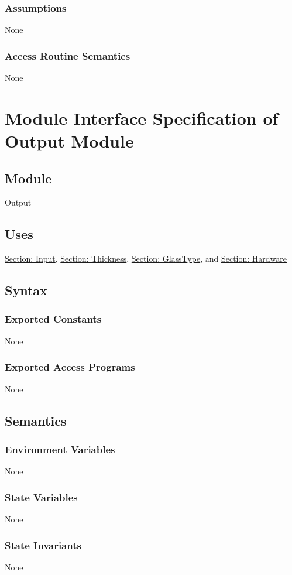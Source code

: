 \documentclass[12pt]{article}
\begin{document}
\subsubsection{Assumptions}
\label{Sec:Assumps}
None
\subsubsection{Access Routine Semantics}
\label{Sec:AccRoutSemantics}
None
\section{Module Interface Specification of Output Module}
\label{Sec:Output}
\subsection{Module}
\label{Sec:Module}
Output
\subsection{Uses}
\label{Sec:Uses}
\hyperref[Sec:InputADT]{Section: Input}, \hyperref[Sec:ThicknessADT]{Section: Thickness}, \hyperref[Sec:GlassTypeADT]{Section: GlassType}, and \hyperref[Sec:HardwareADT]{Section: Hardware}
\subsection{Syntax}
\label{Sec:Syntax}
\subsubsection{Exported Constants}
\label{Sec:ExpConstants}
None
\subsubsection{Exported Access Programs}
\label{Sec:ExpAccPrograms}
None
\subsection{Semantics}
\label{Sec:Semantics}
\subsubsection{Environment Variables}
\label{Sec:EnviroVars}
None
\subsubsection{State Variables}
\label{Sec:StateVars}
None
\subsubsection{State Invariants}
\label{Sec:StateInvars}
None
\end{document}
